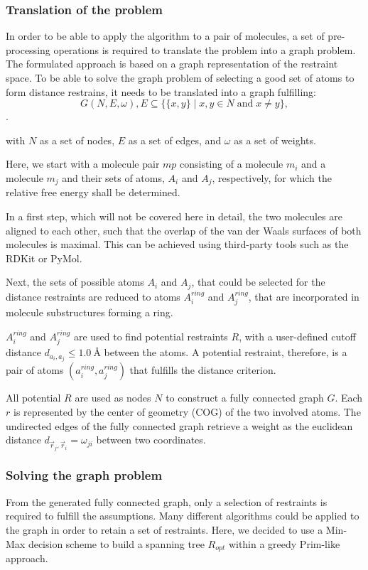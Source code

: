 \subsubsection{Translation of the problem}
In order to be able to apply the algorithm to a pair of molecules, a set of pre-processing operations is required to translate the problem into a graph problem. 
The formulated approach is based on a graph representation of the restraint space. To be able to solve the graph problem of selecting a good set of atoms to form distance restrains, it needs to be translated into a graph fulfilling:
\begin{equation}
    G(N, E, \omega), E \subseteq \{\{x,y\}\mid x,y\in N\;{\textrm {and}}\;x\neq y\},
\end{equation}. \cite{}

with $N$ as a set of nodes, $E$ as a set of edges, and $\omega$ as a set of weights.

Here, we start with a molecule pair $mp$ consisting of a molecule $m_i$ and a molecule $m_j$ and their sets of atoms, $A_i$ and $A_j$, respectively, for which the relative free energy shall be determined. 

In a first step, which will not be covered here in detail, the two molecules are aligned to each other, such that the overlap of the van der Waals surfaces of both molecules is maximal. This can be achieved using third-party tools such as the RDKit or PyMol. \cite{landrum2021, DeLano2020}

Next, the sets of possible atoms $A_i$ and $A_j$, that could be selected for the distance restraints are reduced to atoms  $A^{ring}_i$ and  $A^{ring}_j$, that are incorporated in molecule substructures forming a ring. 

$A^{ring}_i$ and  $A^{ring}_j$ are used to find potential restraints $R$,  with a user-defined cutoff distance $d_{a_i, a_j} \leq 1.0~\text{\AA}$ between the atoms. 
A potential restraint, therefore, is a pair of atoms $(a^{ring}_i, a^{ring}_j)$ that fulfills the distance criterion.

All potential $R$ are used as nodes $N$ to construct a fully connected graph $G$. 
Each $r$ is represented by the center of geometry (COG) of the two involved atoms.
The undirected edges of the fully connected graph retrieve a weight as the euclidean distance $d_{\vec{r}_j,\vec{r}_i}=\omega_{ji}$ between two coordinates. 

\subsubsection{Solving the graph problem}
From the generated fully connected graph, only a selection of restraints is required to fulfill the assumptions. Many different algorithms could be applied to the graph in order to retain a set of restraints. Here, we decided to use a Min-Max decision scheme to build a spanning tree $R_{opt}$ within a greedy Prim-like approach.

